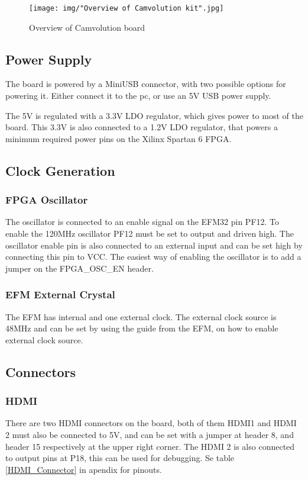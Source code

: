 \begin{figure}
    \texttt{[image: img/"Overview of Camvolution kit".jpg]}
    \caption{Overview of Camvolution board}
    \label{fig:BoardLayout}
\end{figure}

\subsection{Power Supply}
The board is powered by a MiniUSB connector, with two possible options for powering it. Either connect it to the pc, or use an 5V USB power supply.

The 5V is regulated with a 3.3V LDO regulator, which gives power to most of the board.
This 3.3V is also connected to a 1.2V LDO regulator, that powers a minimum required power pins on the Xilinx Spartan 6 FPGA. 

\subsection{Clock Generation}
\subsubsection{FPGA Oscillator}The oscillator is connected to an enable signal on the EFM32 pin PF12.
To enable the 120MHz oscillator PF12 must be set to output and driven high.
The oscillator enable pin is also connected to an external input and can be set high by connecting this pin to VCC.
The easiest way of enabling the oscillator is to add a jumper on the FPGA\_OSC\_EN header.

\subsubsection{EFM External Crystal}
The EFM has internal and one external clock.
The external clock source is 48MHz and can be set by using the guide from the EFM, on how to enable external clock source.

\subsection{Connectors}
\subsubsection{HDMI}
There are two HDMI connectors on the board, both of them HDMI1 and HDMI 2 must also be connected to 5V, and can be set with a jumper at header 8, and header 15 respectively at the upper right corner.
The HDMI 2 is also connected to output pins at P18, this can be used for debugging.
Se table \ref{HDMI_Connector} in apendix for pinouts.

